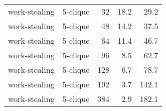 \begin{longtable}{llr|rr}
         work-stealing &  5-clique &           32 &   18.2 &     29.2 \\
         work-stealing &  5-clique &           48 &   14.2 &     37.5 \\
         work-stealing &  5-clique &           64 &   11.4 &     46.7 \\
         work-stealing &  5-clique &           96 &    8.5 &     62.7 \\
         work-stealing &  5-clique &          128 &    6.7 &     78.7 \\
         work-stealing &  5-clique &          192 &    3.7 &    142.1 \\
         work-stealing &  5-clique &          384 &    2.9 &    182.1 \\
\end{longtable}

